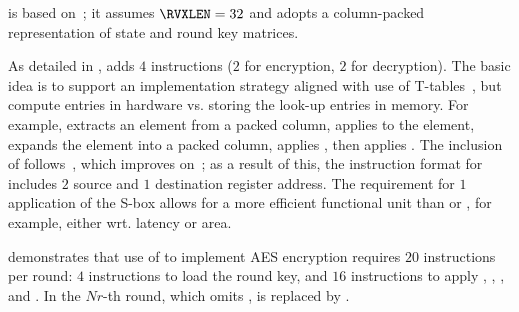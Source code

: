 
is based on~\cite{NadIkeKur:04,BBFR:06,Saarinen:20}; it
assumes 
$\RVXLEN = 32$
and adopts a 
column-packed 
representation of state and round key matrices.

As detailed in
,
adds
$ 4$
instructions ($2$ for encryption, $2$ for decryption).
The basic idea is to support an implementation strategy aligned with use
of 
T-tables~\cite[Section 4.2]{DaeRij:02}, 
but compute entries in hardware vs. storing the look-up entries in memory.
For example,
extracts                     an     element from a packed column,
 applies   to the element,
 expands                        the element into a packed column,
 applies ,
then
 applies .
The inclusion of  follows~\cite{Saarinen:20}, which
improves on~\cite{NadIkeKur:04,BBFR:06}; as a result of this,
the instruction format for
includes $2$ source and $1$ destination register address.
The requirement for $1$ application of the S-box allows for a more efficient 
functional unit than  or , for example, either wrt. latency or 
area.

demonstrates that use of  to implement AES encryption requires
$20$ instructions per round:
$ 4$            
     instructions to load the round key,
and
$16$  
     instructions to apply , , , and .
In the $Nr$-th round, which omits ,
is replaced by 
     .

